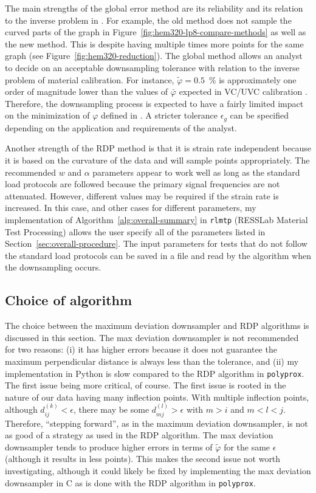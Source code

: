 \documentclass[a4paper,11pt]{article}
\begin{document}
The main strengths of the global error method are its reliability and its relation to the inverse problem in \citet{deCastroeSousaConsistencySolvingInverse2020}.
For example, the old method does not sample the curved parts of the graph in Figure~\ref{fig:hem320-lp8-compare-methods} as well as the new method.
This is despite having multiple times more points for the same graph (see Figure~\ref{fig:hem320-reduction}).
The global method allows an analyst to decide on an acceptable downsampling tolerance with relation to the inverse problem of material calibration.
For instance, $\tilde{\varphi} = 0.5$~\% is approximately one order of magnitude lower than the values of $\bar{\varphi}$ expected in VC/UVC calibration \citep{deCastroeSousaConsistencySolvingInverse2020}.
Therefore, the downsampling process is expected to have a fairly limited impact on the minimization of $\varphi$ defined in \citet{deCastroeSousaConsistencySolvingInverse2020}.
A stricter tolerance $\epsilon_g$ can be specified depending on the application and requirements of the analyst.

Another strength of the RDP method is that it is strain rate independent because it is based on the curvature of the data and will sample points appropriately.
The recommended $w$ and $\alpha$ parameters appear to work well as long as the standard load protocols are followed because the primary signal frequencies are not attenuated.
However, different values may be required if the strain rate is increased.
In this case, and other cases for different parameters, my implementation of Algorithm~\ref{alg:overall-summary} in \texttt{rlmtp} (RESSLab Material Test Processing) allows the user specify all of the parameters listed in Section~\ref{sec:overall-procedure}.
The input parameters for tests that do not follow the standard load protocols can be saved in a file and read by the algorithm when the downsampling occurs.

\subsection{Choice of algorithm}

The choice between the maximum deviation downsampler and RDP algorithms is discussed in this section.
The max deviation downsampler is not recommended for two reasons:
(i) it has higher errors because it does not guarantee the maximum perpendicular distance is always less than the tolerance, and (ii) my implementation in Python is slow compared to the RDP algorithm in \texttt{polyprox}.
The first issue being more critical, of course.
The first issue is rooted in the nature of our data having many inflection points.
With multiple inflection points, although $d^{(k)}_{ij} < \epsilon$, there may be some $d^{(l)}_{mj} > \epsilon$ with $m > i$ and $m < l < j$.
Therefore, ``stepping forward'', as in the maximum deviation downsampler, is not as good of a strategy as used in the RDP algorithm.
The max deviation downsampler tends to produce higher errors in terms of $\tilde{\varphi}$ for the same $\epsilon$ (although it results in less points).
This makes the second issue not worth investigating, although it could likely be fixed by implementing the max deviation downsampler in C as is done with the RDP algorithm in \texttt{polyprox}.
\end{document}
